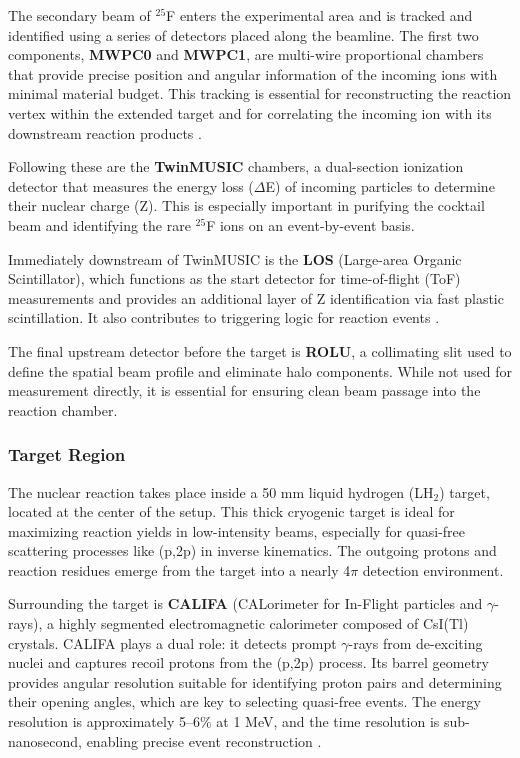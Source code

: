 The secondary beam of $^{25}$F enters the experimental area and is tracked and identified using a series of detectors placed along the beamline. The first two components, \textbf{MWPC0} and \textbf{MWPC1}, are multi-wire proportional chambers that provide precise position and angular information of the incoming ions with minimal material budget. This tracking is essential for reconstructing the reaction vertex within the extended target and for correlating the incoming ion with its downstream reaction products \cite{paschalis_-beam_2015}.

Following these are the \textbf{TwinMUSIC} chambers, a dual-section ionization detector that measures the energy loss ($\Delta$E) of incoming particles to determine their nuclear charge (Z). This is especially important in purifying the cocktail beam and identifying the rare $^{25}$F ions on an event-by-event basis.

Immediately downstream of TwinMUSIC is the \textbf{LOS} (Large-area Organic Scintillator), which functions as the start detector for time-of-flight (ToF) measurements and provides an additional layer of Z identification via fast plastic scintillation. It also contributes to triggering logic for reaction events \cite{panin2024neutron}.

The final upstream detector before the target is \textbf{ROLU}, a collimating slit used to define the spatial beam profile and eliminate halo components. While not used for measurement directly, it is essential for ensuring clean beam passage into the reaction chamber.


\subsubsection{Target Region}

The nuclear reaction takes place inside a 50 mm liquid hydrogen (LH$_2$) target, located at the center of the setup. This thick cryogenic target is ideal for maximizing reaction yields in low-intensity beams, especially for quasi-free scattering processes like (p,2p) in inverse kinematics. The outgoing protons and reaction residues emerge from the target into a nearly 4$\pi$ detection environment.

Surrounding the target is \textbf{CALIFA} (CALorimeter for In-Flight particles and $\gamma$-rays), a highly segmented electromagnetic calorimeter composed of CsI(Tl) crystals. CALIFA plays a dual role: it detects prompt $\gamma$-rays from de-exciting nuclei and captures recoil protons from the (p,2p) process. Its barrel geometry provides angular resolution suitable for identifying proton pairs and determining their opening angles, which are key to selecting quasi-free events. The energy resolution is approximately 5–6\% at 1 MeV, and the time resolution is sub-nanosecond, enabling precise event reconstruction \cite{cortina-gil_califa_2014}.


